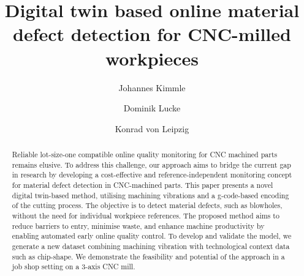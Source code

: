 \documentclass[5p,times,procedia]{elsarticle}
\begin{document}
\begin{frontmatter}






\title{Digital twin based online material defect detection for CNC-milled workpieces}




\author[a,b]{Johannes Kimmle} 
\author[a,c]{Dominik Lucke}%
\author[b]{Konrad von Leipzig}

\address[a]{ESB Business School, Reutlingen University, Alteburgstra\ss e 150, 72762 Reutlingen, Germany}
\address[b]{Department of Industrial Engineering, Stellenbosch University, Joubert Street, Stellenbosch, 7600, South Africa}
\address[c]{Fraunhofer Institute for Manufacturing Engineering and Automation IPA, Nobelstra\ss e 12, 70569 Stuttgart, Germany}


\begin{abstract}
Reliable lot-size-one compatible online quality monitoring for CNC machined parts remains elusive.
To address this challenge, our approach aims to bridge the current gap in research by developing a cost-effective and reference-independent monitoring concept for material defect detection in CNC-machined parts. This paper presents a novel digital twin-based method, utilising machining vibrations and a g-code-based encoding of the cutting process. The objective is to detect material defects, such as blowholes, without the need for individual workpiece references. The proposed method aims to reduce barriers to entry, minimise waste, and enhance machine productivity by enabling automated early online quality control. To develop and validate the model, we generate a new dataset combining machining vibration with technological context data such as chip-shape. We demonstrate the feasibility and potential of the approach in a job shop setting on a 3-axis CNC mill.
\end{abstract}


\end{frontmatter}
\end{document}

